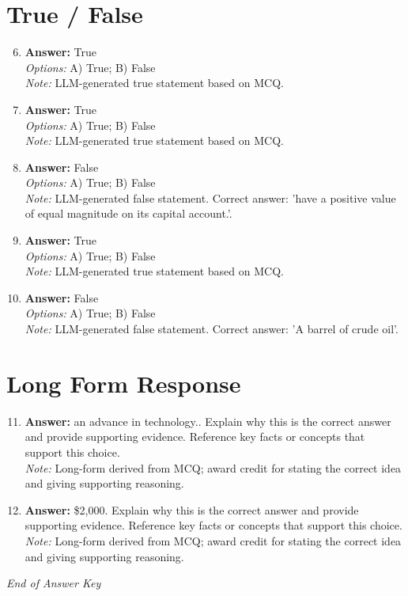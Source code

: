 \documentclass[12pt]{article}
\begin{document}
\section*{True / False}
\begin{enumerate}[label=\arabic*.]
\setcounter{enumi}{5}
\item \textbf{Answer:} True
\\ \textit{Options:} A) True; B) False
\\ \textit{Note:} LLM-generated true statement based on MCQ.
\item \textbf{Answer:} True
\\ \textit{Options:} A) True; B) False
\\ \textit{Note:} LLM-generated true statement based on MCQ.
\item \textbf{Answer:} False
\\ \textit{Options:} A) True; B) False
\\ \textit{Note:} LLM-generated false statement. Correct answer: 'have a positive value of equal magnitude on its capital account.'.
\item \textbf{Answer:} True
\\ \textit{Options:} A) True; B) False
\\ \textit{Note:} LLM-generated true statement based on MCQ.
\item \textbf{Answer:} False
\\ \textit{Options:} A) True; B) False
\\ \textit{Note:} LLM-generated false statement. Correct answer: 'A barrel of crude oil'.
\end{enumerate}

\section*{Long Form Response}
\begin{enumerate}[label=\arabic*.]
\setcounter{enumi}{10}
\item \textbf{Answer:} an advance in technology.. Explain why this is the correct answer and provide supporting evidence. Reference key facts or concepts that support this choice.
\\ \textit{Note:} Long-form derived from MCQ; award credit for stating the correct idea and giving supporting reasoning.
\item \textbf{Answer:} \$2,000. Explain why this is the correct answer and provide supporting evidence. Reference key facts or concepts that support this choice.
\\ \textit{Note:} Long-form derived from MCQ; award credit for stating the correct idea and giving supporting reasoning.
\end{enumerate}

\vfill
\noindent\textit{End of Answer Key}
\end{document}
